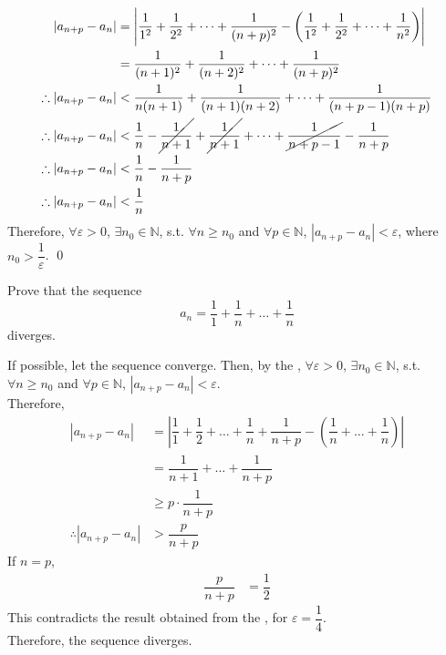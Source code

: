 \documentclass[fleqn, a4paper, 12pt, twoside]{article}
\theoremstyle{definition}
\theoremstyle{theorem}
\begin{document}
{\begin{solution}
	\begin{align*}
		|a_{n + p} - a_n| &= \left| \dfrac{1}{1^2} + \dfrac{1}{2^2} + \dots + \dfrac{1}{(n + p)^2} - \left( \dfrac{1}{1^2} + \dfrac{1}{2^2} + \dots + \dfrac{1}{n^2} \right) \right|\\
		&= \dfrac{1}{(n + 1)^2} + \dfrac{1}{(n + 2)^2} + \dots + \dfrac{1}{(n + p)^2}\\
		\therefore |a_{n + p} - a_n| &< \dfrac{1}{n (n + 1)} + \dfrac{1}{(n + 1)(n + 2)} + \dots + \dfrac{1}{(n + p - 1)(n + p)}\\
		\therefore |a_{n + p} - a_n| &< \dfrac{1}{n} - \cancel{\dfrac{1}{n + 1}} + \cancel{\dfrac{1}{n + 1}} + \dots + \cancel{\dfrac{1}{n + p - 1}} - \dfrac{1}{n + p}\\
		\therefore |a_{n + p} - a_n| &< \dfrac{1}{n} - \dfrac{1}{n + p}\\
		\therefore |a_{n + p} - a_n| &< \dfrac{1}{n}
	\end{align*}
	Therefore, $\forall \varepsilon > 0$, $\exists n_0 \in \mathbb{N}$, s.t. $\forall n \geq n_0$ and $\forall p \in \mathbb{N}$, $|a_{n + p} - a_n| < \varepsilon$, where $n_0 > \dfrac{1}{\varepsilon}$.
	\qed
\end{solution}

\begin{question}
	Prove that the sequence
	\begin{equation*}
		a_n = \dfrac{1}{1} + \dfrac{1}{n} + \dots + \dfrac{1}{n}
	\end{equation*}
	diverges.
\end{question}

\begin{solution}
	If possible, let the sequence converge.
	Then, by the , $\forall \varepsilon > 0$, $\exists n_0 \in \mathbb{N}$, s.t. $\forall n \geq n_0$ and $\forall p \in \mathbb{N}$, $|a_{n + p} - a_n| < \varepsilon$.\\
	Therefore,
	\begin{align*}
		|a_{n + p} - a_n| &= \left| \dfrac{1}{1} + \dfrac{1}{2} + \dots + \dfrac{1}{n} + \dfrac{1}{n + p} - \left( \dfrac{1}{n} + \dots + \dfrac{1}{n} \right) \right|\\
		&= \dfrac{1}{n + 1} + \dots + \dfrac{1}{n + p}\\
		&\ge p \cdot \dfrac{1}{n + p}\\
		\therefore |a_{n + p} - a_n| &> \dfrac{p}{n + p}
	\end{align*}
	If $n = p$,
	\begin{align*}
		\dfrac{p}{n + p} &= \dfrac{1}{2}
	\end{align*}
	This contradicts the result obtained from the , for $\varepsilon = \dfrac{1}{4}$.\\
	Therefore, the sequence diverges.
\end{solution}

}
\end{document}
